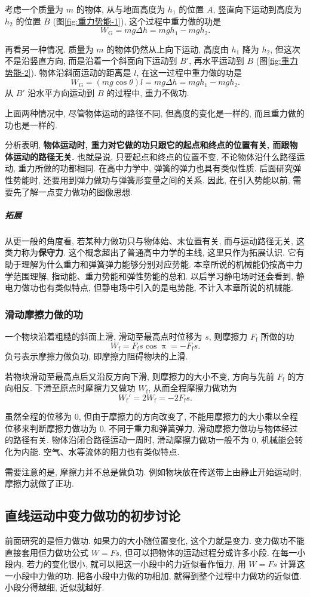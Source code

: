 \documentclass[UTF8,openany,fontset=fandol]{ctexbook}
\theoremstyle{chinesetextbook}
\begin{document}
考虑一个质量为 $m$ 的物体, 从与地面高度为 $h_1$ 的位置 $A$, 竖直向下运动到高度为 $h_2$ 的位置 $B$ (图\ref{fig:重力势能-1}), 这个过程中重力做的功是
\[
W_\text{G}=mg\Delta h=mgh_1-mgh_2.
\]

再看另一种情况. 质量为 $m$ 的物体仍然从上向下运动, 高度由 $h_1$ 降为 $h_2$, 但这次不是沿竖直方向, 而是沿着一个斜面向下运动到 $B'$, 再水平运动到 $B$ (图\ref{fig:重力势能-2}). 物体沿斜面运动的距离是 $l$, 在这一过程中重力做的功是
\[
W_\text{G}=(mg\cos\theta)l=mg\Delta h=mgh_1-mgh_2.
\]
从 $B'$ 沿水平方向运动到 $B$ 的过程中, 重力不做功.

上面两种情况中, 尽管物体运动的路径不同, 但高度的变化是一样的, 而且重力做的功也是一样的.

分析表明, \textbf{物体运动时, 重力对它做的功只跟它的起点和终点的位置有关, 而跟物体运动的路径无关.} 也就是说, 只要起点和终点的位置不变, 不论物体沿什么路径运动, 重力所做的功都相同. 在高中力学中, 弹簧的弹力也具有类似性质. 后面研究弹性势能时, 还要用到弹力做功与弹簧形变量之间的关系. 因此, 在引入势能以前, 需要先了解一点变力做功的图像思想.

\subparagraph{拓展} 从更一般的角度看, 若某种力做功只与物体始、末位置有关, 而与运动路径无关, 这类力称为\textbf{保守力}. 这个概念超出了普通高中力学的主线, 这里只作为拓展认识. 它有助于理解为什么重力和弹簧弹力能够分别对应势能. 本章所说的机械能仍按高中力学范围理解, 指动能、重力势能和弹性势能的总和. 以后学习静电场时还会看到, 静电力做功也有类似特点, 但静电场中引入的是电势能, 不计入本章所说的机械能.
\subsubsection{滑动摩擦力做的功}
一个物块沿着粗糙的斜面上滑, 滑动至最高点时位移为 $s$, 则摩擦力 $F_\mathrm{f}$ 所做的功
\[
W_\mathrm{f}=F_\mathrm{f}s\cos\uppi=-F_\mathrm{f}s.
\]
负号表示摩擦力做负功, 即摩擦力阻碍物块的上滑.

若物块滑动至最高点后又沿反方向下滑, 则摩擦力的大小不变, 方向与先前 $F_\mathrm{f}$ 的方向相反. 下滑至原点时摩擦力又做功 $W_\mathrm{f}$, 从而全程摩擦力做功为
\[
W_\mathrm{f}'=2W_\mathrm{f}=-2F_\mathrm{f}s.
\]

虽然全程的位移为 0, 但由于摩擦力的方向改变了, 不能用摩擦力的大小乘以全程位移来判断摩擦力做功为 0. 不同于重力和弹簧弹力, 滑动摩擦力做功与物体经过的路径有关. 物体沿闭合路径运动一周时, 滑动摩擦力做功一般不为 0, 机械能会转化为内能. 空气、水等流体的阻力也有类似特点.

需要注意的是, 摩擦力并不总是做负功. 例如物块放在传送带上由静止开始运动时, 摩擦力就做了正功.
\subsection{直线运动中变力做功的初步讨论}
前面研究的是恒力做功. 如果力的大小随位置变化, 这个力就是变力. 变力做功不能直接套用恒力做功公式 $W=Fs$, 但可以把物体的运动过程分成许多小段. 在每一小段内, 若力的变化很小, 就可以把这一小段中的力近似看作恒力, 用 $W=Fs$ 计算这一小段中力做的功. 把各小段中力做的功相加, 就得到整个过程中力做功的近似值. 小段分得越细, 近似就越好.
\end{document}
